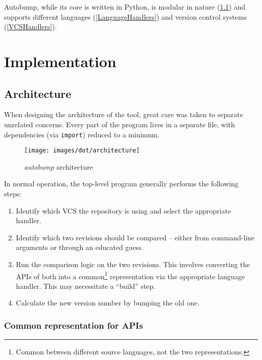 \documentclass{l4proj}
\begin{document}
Autobump, while its core is written in Python, is modular in
nature (\ref{Architecture}) and supports different
languages (\ref{LanguageHandlers}) and version control
systems (\ref{VCSHandlers}).

\chapter{Implementation}

\section{Architecture}
\label{Architecture}

When designing the architecture of the tool, great care was taken to
separate unrelated concerns. Every part of the program lives in a
separate file, with dependencies (via \texttt{import}) reduced to a minimum.

\begin{minipage}{0.5\textwidth}
\begin{figure}[H]
\centering
\texttt{[image: images/dot/architecture]}
\caption{\textit{autobump} architecture}
\end{figure}
\end{minipage}
\begin{minipage}{0.5\textwidth}
In normal operation, the top-level program generally performs the
following steps:

\begin{enumerate}
\item Identify which VCS the repository is using and select the
appropriate handler.
\item Identify which two revisions should be compared -- either from
command-line arguments or through an educated guess.
\item Run the comparison logic on the two revisions. This involves
converting the APIs of both into a common\footnote{Common between
different source languages, not the two representations.} representation via
the appropriate language handler. This may necessitate a ``build'' step.
\item Calculate the new version number by bumping the old one.
\end{enumerate}
\end{minipage}

\subsection{Common representation for APIs}
\end{document}
